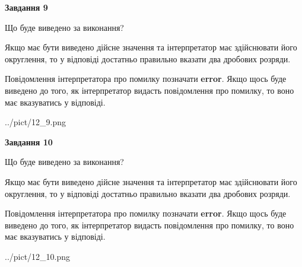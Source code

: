 \documentclass[12pt, ukrainian]{article}
\begin{document}
{\begin {Large}
{\begin {center}\textbf{Завдання 9}\end {center}}\par
Що буде виведено за виконання? \par

Якщо має бути виведено дійсне значення та інтерпретатор має здійснювати його округлення, 
то у відповіді достатньо правильно вказати два дробових розряди.

Повідомлення інтерпретатора про помилку позначати \textbf{error}.
Якщо щось буде виведено до того, як інтерпретатор видасть повідомлення про помилку, 
то воно має вказуватись у відповіді. \par

\begin{center}
	{../pict/12_9.png}
\end{center}
\newpage

{\begin {center}\textbf{Завдання 10}\end {center}}\par
Що буде виведено за виконання? \par

Якщо має бути виведено дійсне значення та інтерпретатор має здійснювати його округлення, 
то у відповіді достатньо правильно вказати два дробових розряди.

Повідомлення інтерпретатора про помилку позначати \textbf{error}.
Якщо щось буде виведено до того, як інтерпретатор видасть повідомлення про помилку, 
то воно має вказуватись у відповіді. \par

\begin{center}
	{../pict/12_10.png}
\end{center}
\newpage

\end {Large}}
\end{document}
